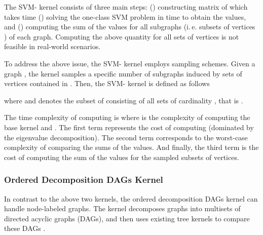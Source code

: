 \documentclass[twoside,11pt]{article}
\newcommand{\ie}{i.\,e. }
\begin{document}
The SVM- kernel consists of three main steps: () constructing matrix  of  which takes  time () solving the one-class SVM problem in  time to obtain the  values, and () computing the sum of the  values for all subgraphs (\ie subsets of vertices ) of each graph.
Computing the above quantity for all  sets of vertices is not feasible in real-world scenarios.

To address the above issue, the SVM- kernel employs sampling schemes.
Given a graph , the kernel samples a specific number of subgraphs induced by sets of vertices contained in .
Then, the SVM- kernel is defined as follows

where  and  denotes the subset of  consisting of all sets of cardinality , that is .

The time complexity of computing  is  where  is the complexity of computing the base kernel  and .
The first term represents the cost of computing  (dominated by the eigenvalue decomposition).
The second term corresponds to the worst-case complexity of comparing the sums of the  values.
And finally, the third term is the cost of computing the sum of the  values for the sampled subsets of vertices.

\subsubsection{Ordered Decomposition DAGs Kernel}
In contrast to the above two kernels, the ordered decomposition DAGs kernel can handle node-labeled graphs.
The kernel decomposes graphs into multisets of directed acyclic graphs (DAGs), and then uses existing tree kernels to compare these DAGs \cite{da2012tree}.
\end{document}
